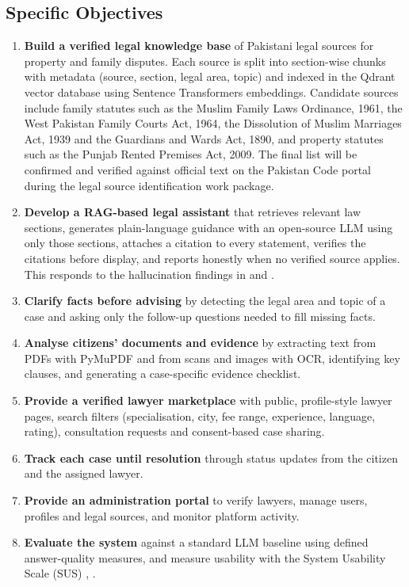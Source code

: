 \subsection{Specific Objectives}

\begin{enumerate}
  \item \textbf{Build a verified legal knowledge base} of Pakistani legal sources for property and family disputes. Each source is split into section-wise chunks with metadata (source, section, legal area, topic) and indexed in the Qdrant vector database using Sentence Transformers embeddings. Candidate sources include family statutes such as the Muslim Family Laws Ordinance, 1961, the West Pakistan Family Courts Act, 1964, the Dissolution of Muslim Marriages Act, 1939 and the Guardians and Wards Act, 1890, and property statutes such as the Punjab Rented Premises Act, 2009. The final list will be confirmed and verified against official text on the Pakistan Code portal \cite{r31} during the legal source identification work package.
  \item \textbf{Develop a RAG-based legal assistant} that retrieves relevant law sections, generates plain-language guidance with an open-source LLM using only those sections, attaches a citation to every statement, verifies the citations before display, and reports honestly when no verified source applies. This responds to the hallucination findings in \cite{r8} and \cite{r9}.
  \item \textbf{Clarify facts before advising} by detecting the legal area and topic of a case and asking only the follow-up questions needed to fill missing facts.
  \item \textbf{Analyse citizens' documents and evidence} by extracting text from PDFs with PyMuPDF and from scans and images with OCR, identifying key clauses, and generating a case-specific evidence checklist.
  \item \textbf{Provide a verified lawyer marketplace} with public, profile-style lawyer pages, search filters (specialisation, city, fee range, experience, language, rating), consultation requests and consent-based case sharing.
  \item \textbf{Track each case until resolution} through status updates from the citizen and the assigned lawyer.
  \item \textbf{Provide an administration portal} to verify lawyers, manage users, profiles and legal sources, and monitor platform activity.
  \item \textbf{Evaluate the system} against a standard LLM baseline using defined answer-quality measures, and measure usability with the System Usability Scale (SUS) \cite{r29}, \cite{r30}.
\end{enumerate}

